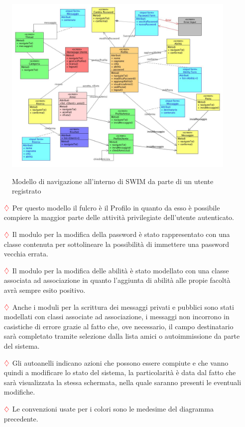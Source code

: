 \begin{figure} [!hbtp]
\centering
\includegraphics[scale=0.40]{uxEsperienzaRegistrato.jpg} \\
\caption{\label{uxRegistrato} Modello di navigazione all'interno di SWIM da parte di un utente registrato }
\end{figure}

\begin{itemize}
\item[$\textcolor{red}{\diamondsuit}$] Per questo modello il fulcro è il Profilo in quanto da esso è possibile compiere la maggior parte delle attività privilegiate dell'utente autenticato.
\item[$\textcolor{red}{\diamondsuit}$] Il modulo per la modifica della password è stato rappresentato con una classe contenuta per sottolineare la possibilità di immettere una password vecchia errata.
\item[$\textcolor{red}{\diamondsuit}$] Il modulo per la modifica delle abilità è stato modellato con una classe associata ad associazione in quanto l'aggiunta di abilità alle propie facoltà avrà sempre esito positivo.
\item[$\textcolor{red}{\diamondsuit}$] Anche i moduli per la scrittura dei messaggi privati e pubblici sono stati modellati con classi associate ad associazione, i messaggi non incorrono in casistiche di errore grazie al fatto che, ove necessario, il campo destinatario sarà completato tramite selezione dalla lista amici o autoimmissione da parte del sistema. 
\item[$\textcolor{red}{\diamondsuit}$] Gli autoanelli indicano azioni che possono essere compiute e che vanno quindi a modificare lo stato del sistema, la particolarità è data dal fatto che sarà visualizzata la stessa schermata, nella quale saranno presenti le eventuali modifiche.
\item[$\textcolor{red}{\diamondsuit}$] Le convenzioni usate per i colori sono le medesime del diagramma precedente.
\end{itemize}


